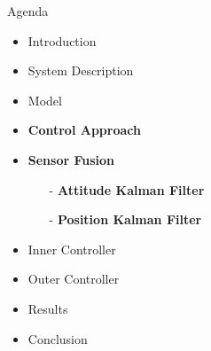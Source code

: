 
\begin{frame}{Agenda}{}
    \begin{itemize}
        \item Introduction
        \item System Description
        \item Model
        \item \textcolor{aaublue}{\textbf{Control Approach}}
        \item \textcolor{aaublue}{\textbf{Sensor Fusion}}
        \begin{itemize}
            \item[-] \textcolor{aaublue}{\textbf{Attitude Kalman Filter}}
            \item[-] \textcolor{aaublue}{\textbf{Position Kalman Filter}}
        \end{itemize}
        \item Inner Controller
        \item Outer Controller
        \item Results
        \item Conclusion
    \end{itemize}
\end{frame}